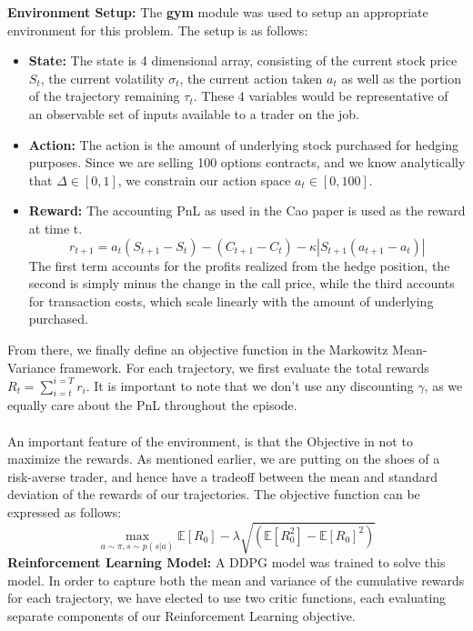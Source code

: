 \documentclass{article}
\begin{document}
\textbf{Environment Setup:} The \textbf{gym} module was used to setup an appropriate environment for this problem. The setup is as follows:
\begin{itemize}
    \item \textbf{State:} The state is 4 dimensional array, consisting of the current stock price $S_t$, the current volatility $\sigma_t$, the current action taken $a_t$ as well as the portion of the trajectory remaining $\tau_t$. These 4 variables would be representative of an observable set of inputs available to a trader on the job.
    \item \textbf{Action:} The action is the amount of underlying stock purchased for hedging purposes. Since we are selling 100 options contracts, and we know analytically that $\Delta \in[0,1]$, we constrain our action space $a_t \in[0, 100]$.
    \item \textbf{Reward:} The accounting PnL as used in the Cao paper\cite{cao} is used as the reward at time t. \begin{equation}
        r_{t+1} = a_{t}(S_{t+1}-S_t)-(C_{t+1}-C_t)-\kappa|S_{t+1}(a_{t+1}-a_t)|
    \end{equation}
    The first term accounts for the profits realized from the hedge position, the second is simply minus the change in the call price, while the third accounts for transaction costs, which scale linearly with the amount of underlying purchased.
\end{itemize}
From there, we finally define an objective function in the Markowitz Mean-Variance framework. For each trajectory, we first evaluate the total rewards $R_t = \sum_{i = t}^{i = T} r_i$. It is important to note that we don't use any discounting $\gamma$, as we equally care about the PnL throughout the episode.\\\\
An important feature of the environment, is that the Objective in not to maximize the rewards. As mentioned earlier, we are putting on the shoes of a risk-averse trader, and hence have a tradeoff between the mean and standard deviation of the rewards of our trajectories. The objective function can be expressed as follows:
\begin{equation}
    \max_{a\sim \pi, s\sim p(s|a)}\mathbb{E}[R_0]- \lambda\sqrt{(\mathbb{E}[R_0^2]-\mathbb{E}[R_0]^2)}
\end{equation}
\textbf{Reinforcement Learning Model:} A DDPG model \cite{lillicrap} was trained to solve this model. In order to capture both the mean and variance of the cumulative rewards for each trajectory, we have elected to use two critic functions, each evaluating separate components of our Reinforcement Learning objective.\\\\
\end{document}
